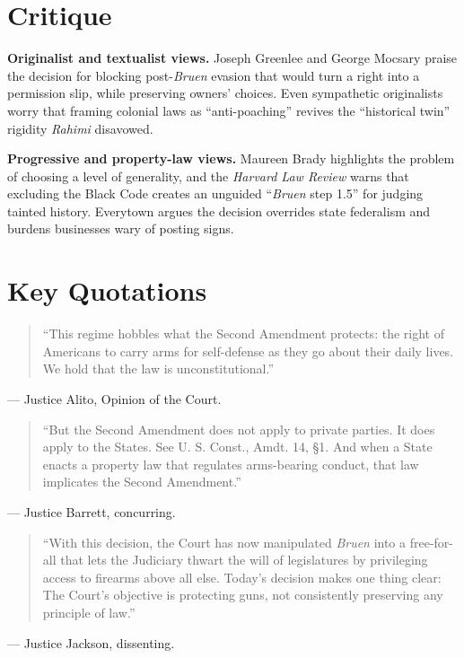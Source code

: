 \documentclass[12pt]{article}
\begin{document}
\section{Critique}

\textbf{Originalist and textualist views.} Joseph Greenlee and George Mocsary praise the decision for blocking post-\textit{Bruen} evasion that would turn a right into a permission slip, while preserving owners' choices. Even sympathetic originalists worry that framing colonial laws as ``anti-poaching'' revives the ``historical twin'' rigidity \textit{Rahimi} disavowed.

\textbf{Progressive and property-law views.} Maureen Brady highlights the problem of choosing a level of generality, and the \textit{Harvard Law Review} warns that excluding the Black Code creates an unguided ``\textit{Bruen} step 1.5'' for judging tainted history. Everytown argues the decision overrides state federalism and burdens businesses wary of posting signs.

\section{Key Quotations}

\begin{quote}
``This regime hobbles what the Second Amendment protects: the right of Americans to carry arms for self-defense as they go about their daily lives. We hold that the law is unconstitutional.''
\end{quote}
\noindent --- Justice Alito, Opinion of the Court.

\begin{quote}
``But the Second Amendment does not apply to private parties. It does apply to the States. See U. S. Const., Amdt. 14, \S{}1. And when a State enacts a property law that regulates arms-bearing conduct, that law implicates the Second Amendment.''
\end{quote}
\noindent --- Justice Barrett, concurring.

\begin{quote}
``With this decision, the Court has now manipulated \textit{Bruen} into a free-for-all that lets the Judiciary thwart the will of legislatures by privileging access to firearms above all else. Today's decision makes one thing clear: The Court's objective is protecting guns, not consistently preserving any principle of law.''
\end{quote}
\noindent --- Justice Jackson, dissenting.
\end{document}
